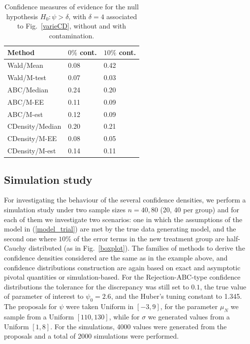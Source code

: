 \documentclass[preprint,12pt,authoryear]{elsarticle}
\begin{document}
 
\begin{table}[h]
\centering
\begin{tabular}{|l|l|l|}
  \hline 
  Method &  $0\%$ cont. &  $10\%$ cont.   \\ 
  \hline 
  Wald/Mean & 0.08& 0.42 \\ 
Wald/M-test & 0.07& 0.03\\ 
ABC/Median & 0.24 & 0.20  \\ 
   ABC/M-EE  & 0.11 & 0.09 \\ 
   ABC/M-est & 0.12 & {0.09} \\   
  CDensity/Median & 0.20 &   0.21 \\ 
   CDensity/M-EE & 0.08&  0.05\\ 
   CDensity/M-est & 0.14 &   0.11 \\   
   \hline
\end{tabular}
\caption{Confidence measures of evidence for the null hypothesis $H_0: \psi>\delta$, with $\delta=4$ associated to Fig.\ \ref{varieCD}, without and with contamination.}\label{evidence}
\end{table}


\subsection{Simulation study}

For investigating the behaviour of the several confidence densities, we perform a simulation study under  two  sample sizes $n=40, 80$ (20, 40 per group) and  for each of them we investigate two scenarios: one in which the assumptions of the model in (\ref{model_trial}) are met by the true data generating model,
and the second one where $10\%$  of the error terms in the new treatment group are half-Cauchy distributed (as in Fig.\ \ref{boxplot}).
The families of methods to derive the confidence densities considered are the same as in the example above, and confidence distributions construction are again based on exact and asymptotic pivotal quantities or simulation-based.
 For the Rejection-ABC-type confidence distributions  the tolerance for the discrepancy was still set to $0.1$, the true value of  parameter of interest to $\psi_0=2.6$, and the Huber's tuning constant  to 1.345.
The  proposals for $\psi$ were taken  Uniform in $[-3,9]$, for the parameter $\mu_N$ we sample from a Uniform $[110,130]$, while for $\sigma$ we generated values  from a Uniform $[1,8]$. For the simulations, 4000 values were generated from the proposals and a total of 2000 simulations were performed. 
 
\end{document}
